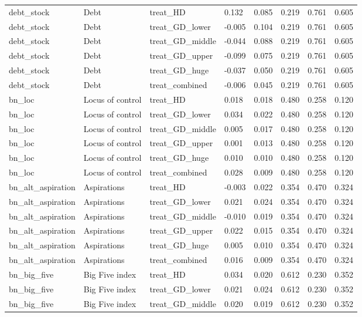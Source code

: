 \begin{tabular}{llllllll}
debt\_stock & Debt & treat\_HD & 0.132 & 0.085 & 0.219 & 0.761 & 0.605 \\
debt\_stock & Debt & treat\_GD\_lower & -0.005 & 0.104 & 0.219 & 0.761 & 0.605 \\
debt\_stock & Debt & treat\_GD\_middle & -0.044 & 0.088 & 0.219 & 0.761 & 0.605 \\
debt\_stock & Debt & treat\_GD\_upper & -0.099 & 0.075 & 0.219 & 0.761 & 0.605 \\
debt\_stock & Debt & treat\_GD\_huge & -0.037 & 0.050 & 0.219 & 0.761 & 0.605 \\
debt\_stock & Debt & treat\_combined & -0.006 & 0.045 & 0.219 & 0.761 & 0.605 \\
bn\_loc & Locus of control & treat\_HD & 0.018 & 0.018 & 0.480 & 0.258 & 0.120 \\
bn\_loc & Locus of control & treat\_GD\_lower & 0.034 & 0.022 & 0.480 & 0.258 & 0.120 \\
bn\_loc & Locus of control & treat\_GD\_middle & 0.005 & 0.017 & 0.480 & 0.258 & 0.120 \\
bn\_loc & Locus of control & treat\_GD\_upper & 0.001 & 0.013 & 0.480 & 0.258 & 0.120 \\
bn\_loc & Locus of control & treat\_GD\_huge & 0.010 & 0.010 & 0.480 & 0.258 & 0.120 \\
bn\_loc & Locus of control & treat\_combined & 0.028 & 0.009 & 0.480 & 0.258 & 0.120 \\
bn\_alt\_aspiration & Aspirations & treat\_HD & -0.003 & 0.022 & 0.354 & 0.470 & 0.324 \\
bn\_alt\_aspiration & Aspirations & treat\_GD\_lower & 0.021 & 0.024 & 0.354 & 0.470 & 0.324 \\
bn\_alt\_aspiration & Aspirations & treat\_GD\_middle & -0.010 & 0.019 & 0.354 & 0.470 & 0.324 \\
bn\_alt\_aspiration & Aspirations & treat\_GD\_upper & 0.022 & 0.015 & 0.354 & 0.470 & 0.324 \\
bn\_alt\_aspiration & Aspirations & treat\_GD\_huge & 0.005 & 0.010 & 0.354 & 0.470 & 0.324 \\
bn\_alt\_aspiration & Aspirations & treat\_combined & 0.016 & 0.009 & 0.354 & 0.470 & 0.324 \\
bn\_big\_five & Big Five index & treat\_HD & 0.034 & 0.020 & 0.612 & 0.230 & 0.352 \\
bn\_big\_five & Big Five index & treat\_GD\_lower & 0.021 & 0.024 & 0.612 & 0.230 & 0.352 \\
bn\_big\_five & Big Five index & treat\_GD\_middle & 0.020 & 0.019 & 0.612 & 0.230 & 0.352 \\

\end{tabular}
